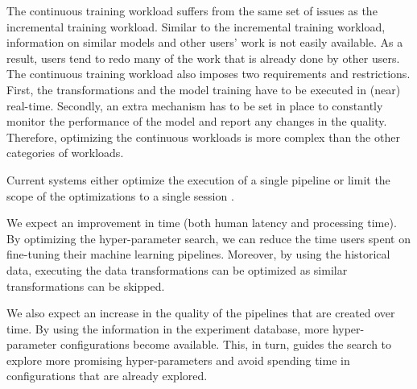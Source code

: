 \documentclass{sig-alternate-05-2015}
\begin{document}
The continuous training workload suffers from the same set of issues as the incremental training workload.
Similar to the incremental training workload, information on similar models and other users' work is not easily available.
As a result, users tend to redo many of the work that is already done by other users.
The continuous training workload also imposes two requirements and restrictions.
First, the transformations and the model training have to be executed in (near) real-time.
Secondly, an extra mechanism has to be set in place to constantly monitor the performance of the model and report any changes in the quality.
Therefore, optimizing the continuous workloads is more complex than the other categories of workloads.

Current systems either optimize the execution of a single pipeline \cite{sparks2017keystoneml} or limit the scope of the optimizations to a single session \cite{zhang2016materialization}.

We expect an improvement in time (both human latency and processing time).
By optimizing the hyper-parameter search, we can reduce the time users spent on fine-tuning their machine learning pipelines.
Moreover, by using the historical data, executing the data transformations can be optimized as similar transformations can be skipped.

We also expect an increase in the quality of the pipelines that are created over time.
By using the information in the experiment database, more hyper-parameter configurations become available. 
This, in turn, guides the search to explore more promising hyper-parameters and avoid spending time in configurations that are already explored.
\end{document}

